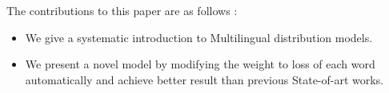 The contributions to this paper are as follows :
\begin{itemize}
	\item We give a systematic introduction to Multilingual distribution models. 
	\item We present a novel model by modifying the weight to loss of each word automatically and achieve better result than previous State-of-art works.  
\end{itemize}





\begin{comment}

Multi-lingual word alignment is important to transferring knowledge between the languages 
	by the carrier of word, which is an application of domain adaption. 
\cmnt{
	[1] What is main problem in this paper? Domain adaption？ Word align？ or else? Unclear.
	[2] I can't understand what "by the carrier of word, which is an application of domain adaption" means.
	}
\todo{clarify main massage}
Based on the fundamental concept in cognitive language 
	that the physiological basis of human beings 
	plays an important role in formation of concepts and language (Add reference here), 
	even the disparate origin of the languages has led to barrier of comprehension, 
	same cognitive mechanism determine the feasibility to transfer the knowledge without supervision. 
\cmnt{
	[1]
	I can't understant grammar of this sentence.
	[2]
	Do not use unpractical words such as "cognitive language" and "physiological basis of human beings".
	[3]
	I can't understand what this sentense means.}
\todo{fix grammar}
For example, 
	with the cognitive concept that the capital is a center of a entity in country category, 
	" Tomboy " in French should have a high similarity with " London " in English. 
\cmnt{
	[1]Not use "cognitive concept".
	[2]I can't understand what this example explains.
	[3] What is the main problem? what is the role of this example?
	}
\todo{clarify them.}


There are several attempts on applying word distribution model in multi-lingual alignment model, 
	which we call it multi-lingual distribution model. 
\cmnt{
	[1] What is "word distribution model"?
	[2] What is the Research Question in this paper?
		"word distribution model" is related to it?
		Why you explain several attempts about it?
}
\todo{You MUST explain our motivations BEFORE describe technical facters.}



\end{comment}
